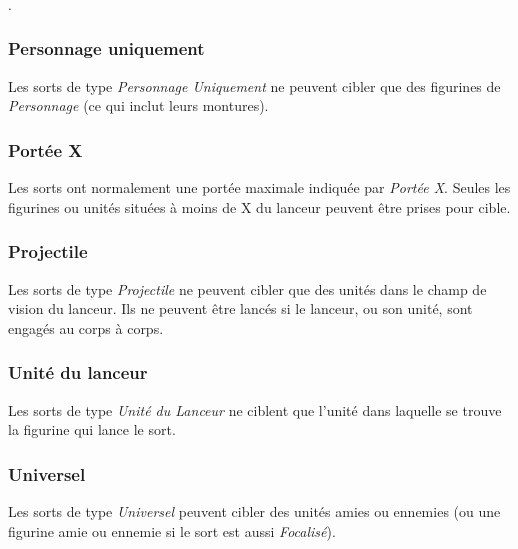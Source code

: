 \subsubsection*{}

.

\subsubsection*{Personnage uniquement}

Les sorts de type \emph{Personnage Uniquement} ne peuvent cibler que des figurines de \emph{Personnage} (ce qui inclut leurs montures).

\subsubsection*{Portée X{\pouce}}

Les sorts ont normalement une portée maximale indiquée par \emph{Portée X{\pouce}}. Seules les figurines ou unités situées à moins de X{\pouce} du lanceur peuvent être prises pour cible.

\subsubsection*{Projectile}

Les sorts de type \emph{Projectile} ne peuvent cibler que des unités dans le champ de vision du lanceur. Ils ne peuvent être lancés si le lanceur, ou son unité, sont engagés au corps à corps.

\subsubsection*{Unité du lanceur}

Les sorts de type \emph{Unité du Lanceur} ne ciblent que l'unité dans laquelle se trouve la figurine qui lance le sort.

\subsubsection*{Universel}

Les sorts de type \emph{Universel} peuvent cibler des unités amies ou ennemies (ou une figurine amie ou ennemie si le sort est aussi \emph{Focalisé}).

